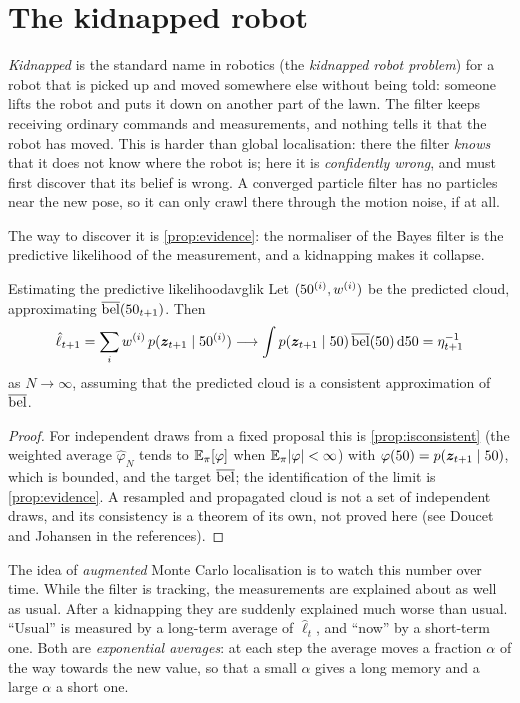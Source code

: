 \section{The kidnapped robot}
\label{sec:amcl}

\emph{Kidnapped} is the standard name in robotics (the \emph{kidnapped
robot problem}) for a robot that is picked up and moved somewhere else
without being told: someone lifts the robot and puts it down on another
part of the lawn. The filter keeps receiving ordinary commands and
measurements, and nothing tells it that the robot has moved. This is
harder than global localisation: there the filter \emph{knows} that it does
not know where the robot is; here it is \emph{confidently wrong}, and must
first discover that its belief is wrong. A converged particle filter has
no particles near the new pose, so it can only crawl there through the
motion noise, if at all.

The way to discover it is \cref{prop:evidence}: the normaliser of the
Bayes filter is the predictive likelihood of the measurement, and a
kidnapping makes it collapse.

\begin{proposition}{Estimating the predictive likelihood}{avglik}
Let $(50^{(i)},w^{(i)})$ be the predicted cloud, approximating
$\overline{\operatorname{bel}}(50_{t+1})$. Then
\[
  \hat\ell_{t+1}=\sum_iw^{(i)}\,p(\bm{z}_{t+1}\mid50^{(i)})
  \longrightarrow\int p(\bm{z}_{t+1}\mid50)\,\overline{\operatorname{bel}}(50)\,\mathrm d50=
  \eta_{t+1}^{-1}
\]
as $N\to\infty$, assuming that the predicted cloud is a consistent
approximation of $\overline{\operatorname{bel}}$.
\end{proposition}

\begin{proof}
For independent draws from a fixed proposal this is
\cref{prop:isconsistent} (the weighted average $\hat\varphi_N$ tends to
$\mathbb{E}_\pi[\varphi]$ when $\mathbb{E}_\pi|\varphi|<\infty$) with $\varphi(50)=p(\bm{z}_{t+1}\mid50)$, which is
bounded, and the target $\overline{\operatorname{bel}}$; the identification of the limit is
\cref{prop:evidence}. A resampled and propagated cloud is not a set of
independent draws, and its consistency is a theorem of its own, not proved
here (see Doucet and Johansen in the references).
\end{proof}

The idea of \emph{augmented} Monte Carlo localisation is to watch this
number over time. While the filter is tracking, the measurements are
explained about as well as usual. After a kidnapping they are suddenly
explained much worse than usual. ``Usual'' is measured by a long-term
average of $\hat\ell_t$, and ``now'' by a short-term one. Both are
\emph{exponential averages}: at each step the average moves a fraction
$\alpha$ of the way towards the new value, so that a small $\alpha$ gives
a long memory and a large $\alpha$ a short one.


